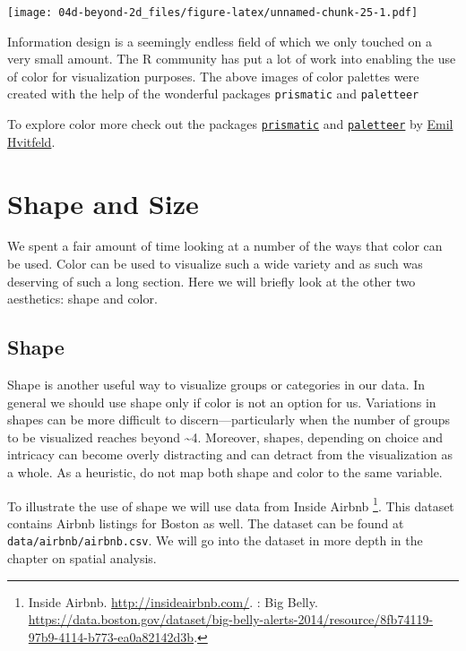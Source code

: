 \documentclass[
]{book}
\begin{document}
\texttt{[image: 04d-beyond-2d\_files/figure-latex/unnamed-chunk-25-1.pdf]}

Information design is a seemingly endless field of which we only touched on a very small amount. The R community has put a lot of work into enabling the use of color for visualization purposes. The above images of color palettes were created with the help of the wonderful packages \texttt{prismatic} and \texttt{paletteer}

To explore color more check out the packages \href{https://github.com/EmilHvitfeldt/prismatic}{\texttt{prismatic}} and \href{https://github.com/EmilHvitfeldt/paletteer}{\texttt{paletteer}} by \href{https://www.hvitfeldt.me/blog/}{Emil Hvitfeld}.

\hypertarget{shape-and-size}{%
\section{Shape and Size}\label{shape-and-size}}

We spent a fair amount of time looking at a number of the ways that color can be used. Color can be used to visualize such a wide variety and as such was deserving of such a long section. Here we will briefly look at the other two aesthetics: shape and color.

\hypertarget{shape}{%
\subsection{Shape}\label{shape}}

Shape is another useful way to visualize groups or categories in our data. In general we should use shape only if color is not an option for us. Variations in shapes can be more difficult to discern---particularly when the number of groups to be visualized reaches beyond \textasciitilde4. Moreover, shapes, depending on choice and intricacy can become overly distracting and can detract from the visualization as a whole. As a heuristic, do not map both shape and color to the same variable.

To illustrate the use of shape we will use data from Inside Airbnb \footnote{Inside Airbnb. \url{http://insideairbnb.com/}.
  \footnotemark{}: Big Belly. \url{https://data.boston.gov/dataset/big-belly-alerts-2014/resource/8fb74119-97b9-4114-b773-ea0a82142d3b}.}. This dataset contains Airbnb listings for Boston as well. The dataset can be found at \texttt{data/airbnb/airbnb.csv}. We will go into the dataset in more depth in the chapter on spatial analysis.
\end{document}
